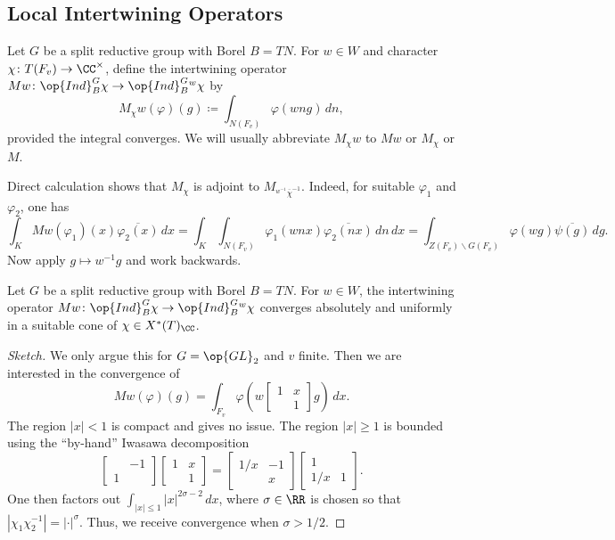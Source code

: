 \documentclass{article}
\begin{document}
\subsection{Local Intertwining Operators}
\begin{definition}
	Let $G$ be a split reductive group with Borel $B=TN$. For $w\in W$ and character $\chi\colon T(F_v)\to\CC^\times$, define the intertwining operator $Mw\colon\op{Ind}_B^G\chi\to\op{Ind}_B^G{^w\chi}$ by
	\[M_\chi w(\varphi)(g)\coloneqq\int_{N(F_v)}\varphi(wng)\,dn,\]
	provided the integral converges. We will usually abbreviate $M_\chi w$ to $Mw$ or $M_\chi$ or $M$.
\end{definition}
\begin{remark}
	Direct calculation shows that $M_\chi$ is adjoint to $M_{^{w^{-1}}\overline\chi^{-1}}$. Indeed, for suitable $\varphi_1$ and $\varphi_2$, one has
	\[\int_{K}Mw(\varphi_1)(x)\overline{\varphi_2(x)}\,dx=\int_{K}\int_{N(F_v)}\varphi_1(wnx)\overline{\varphi_2(nx)}\,dn\,dx=\int_{Z(F_v)\backslash G(F_v)}\varphi(wg)\overline{\psi(g)}\,dg.\]
	Now apply $g\mapsto w^{-1}g$ and work backwards.
\end{remark}
\begin{proposition}
	Let $G$ be a split reductive group with Borel $B=TN$. For $w\in W$, the intertwining operator $Mw\colon\op{Ind}_B^G\chi\to\op{Ind}_B^G{^w\chi}$ converges absolutely and uniformly in a suitable cone of $\chi\in X^*(T)_\CC$.
\end{proposition}
\begin{proof}[Sketch]
	We only argue this for $G=\op{GL}_2$ and $v$ finite. Then we are interested in the convergence of
	\[Mw(\varphi)(g)=\int_{F_v}\varphi\left(w\begin{bmatrix}
		1 & x \\ & 1
	\end{bmatrix}g\right)\,dx.\]
	The region $\left|x\right|<1$ is compact and gives no issue. The region $\left|x\right|\ge1$ is bounded using the ``by-hand'' Iwasawa decomposition
	\[\begin{bmatrix}
		& -1 \\ 1
	\end{bmatrix}\begin{bmatrix}
		1 & x \\ & 1
	\end{bmatrix}=\begin{bmatrix}
		1/x & -1 \\ & x
	\end{bmatrix}\begin{bmatrix}
		1 \\ 1/x & 1
	\end{bmatrix}.\]
	One then factors out $\int_{\left|x\right|\le1}\left|x\right|^{2\sigma-2}\,dx$, where $\sigma\in\RR$ is chosen so that $\left|\chi_1\chi_2^{-1}\right|=\left|\cdot\right|^\sigma$. Thus, we receive convergence when $\sigma>1/2$.
\end{proof}
\end{document}
